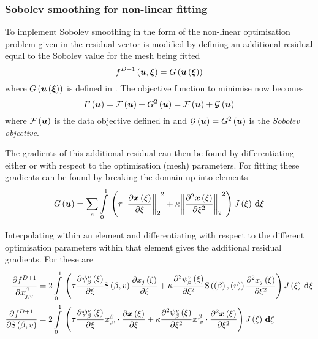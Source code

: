 \subsubsection{Sobolev smoothing for non-linear fitting}

To implement Sobolev smoothing in the form of the non-linear optimisation problem
given in  the residual vector is modified by defining
an additional residual equal to the Sobolev value for the mesh being fitted \ie
\begin{equation}
  \fnof{f^{D+1}}{\vectr{u},\vectr{\xi}}=\fnof{G}{\fnof{\vectr{u}}{\vectr{\xi}}}
  \label{eqn:addSobresidual}
\end{equation}
where $ G\left(  \boldsymbol{u}\left( \boldsymbol{\xi} \right)  \right) $ is defined in
.  The objective function to minimise now becomes
\begin{equation}
   F\left( \boldsymbol{u} \right) = \mathcal{F}\left( \boldsymbol{u} \right) + G^{2}\left( \boldsymbol{u} \right) =
   \mathcal{F}\left( \boldsymbol{u} \right) + \mathcal{G}\left( \boldsymbol{u} \right) 
\end{equation}
where $ \mathcal{F}\left( \boldsymbol{u} \right) $ is the data objective defined in
 and
$ \mathcal{G}\left( \boldsymbol{u} \right) = G^{2}\left( \boldsymbol{u} \right) $ is the \emph{Sobolev
objective}.

The gradients of this additional residual can then be found by differentiating
either  or  with
respect to the optimisation (mesh) parameters. For \twodal fitting these
gradients can be found by breaking the domain up into elements \ie
\begin{equation}
   G\left( \boldsymbol{u} \right) =\displaystyle\sum_{e}  \displaystyle\int\limits_{0}^{1} \,\left( \tau {\ensuremath{\left\|  \dfrac{\partial 
           \boldsymbol{x}\left( \xi \right) }{\partial \xi}  \right\|}_{2}} ^{2}+\kappa {\ensuremath{\left\|  \dfrac{\partial^{2}  
            \boldsymbol{x}\left( \xi \right) }{\partial {\xi}^{2}}  \right\|}_{2}} ^{2} \right) J\left( \xi \right) \, \boldsymbol{\mathrm{d}} \xi 
\end{equation}

Interpolating within an element and differentiating with respect to the
different optimisation parameters within that element gives the additional
residual gradients. For \twods these are
\begin{align}
  \delby{f^{D+1}}{x^{\beta}_{j,v}}&=2\gint{0}{1}{\pbrac{\tau
      \delby{\gbfn{\beta}{v}{\xi}}{\xi}\gsf{\beta}{v}
      \delby{\fnof{x_{j}}{\xi}}{\xi}+\kappa\deltwosqby{\gbfn{\beta}{v}{\xi}}{\xi}
      \gsf{\pbrac{\beta}}{\pbrac{v}}
      \deltwosqby{\fnof{x_{j}}{\xi}}{\xi}}\fnof{J}{\xi}}{\xi} 
  \label{eqn:2Dsobjacnode} \\
  \delby{f^{D+1}}{\gsf{\beta}{v}}&=2\gint{0}{1}{\pbrac{\tau\delby{
        \gbfn{\beta}{v}{\xi}}{\xi}\dotprod{\vectr{x}^{\beta}_{,v}}{
        \delby{\fnof{\vectr{x}}{\xi}}{\xi}}+\kappa\deltwosqby{
        \gbfn{\beta}{v}{\xi}}{\xi}\dotprod{\vectr{x}^{\beta}_{,v}}{
        \deltwosqby{\fnof{\vectr{x}}{\xi}}{\xi}}}\fnof{J}{\xi}}{\xi}
  \label{eqn:2Dsobjacline}
\end{align}

